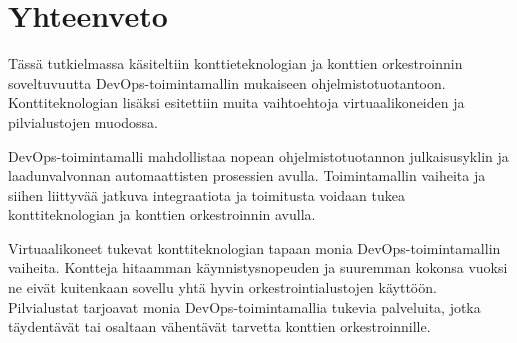 \chapter{Yhteenveto\label{summary}}


Tässä tutkielmassa käsiteltiin konttieteknologian ja konttien orkestroinnin soveltuvuutta DevOps-toimintamallin mukaiseen ohjelmistotuotantoon.
Konttiteknologian lisäksi esitettiin muita vaihtoehtoja virtuaalikoneiden ja pilvialustojen muodossa.

DevOps-toimintamalli mahdollistaa nopean ohjelmistotuotannon julkaisusyklin ja laadunvalvonnan automaattisten prosessien avulla.
Toimintamallin vaiheita ja siihen liittyvää jatkuva integraatiota ja toimitusta voidaan tukea konttiteknologian ja konttien orkestroinnin avulla.

Virtuaalikoneet tukevat konttiteknologian tapaan monia DevOps-toimintamallin vaiheita.
Kontteja hitaamman käynnistysnopeuden ja suuremman kokonsa vuoksi ne eivät kuitenkaan sovellu yhtä hyvin orkestrointialustojen käyttöön.
Pilvialustat tarjoavat monia DevOps-toimintamallia tukevia palveluita, jotka täydentävät tai osaltaan vähentävät tarvetta konttien orkestroinnille.
